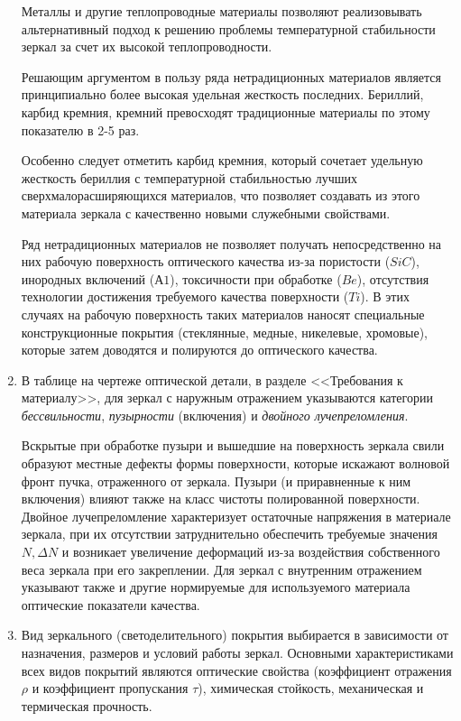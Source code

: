 \begin{enumerate}[leftmargin=*]
Металлы и другие теплопроводные материалы позволяют реализовывать альтернативный подход к решению проблемы температурной стабильности зеркал за счет их высокой теплопроводности.

Решающим аргументом в пользу ряда нетрадиционных материалов является принципиально более высокая удельная жесткость последних. Бериллий, карбид кремния, кремний превосходят традиционные материалы по этому показателю в 2-5 раз.

Особенно следует отметить карбид кремния, который сочетает удельную жесткость бериллия с температурной стабильностью лучших сверхмалорасширяющихся материалов, что позволяет создавать из этого материала зеркала с качественно новыми служебными свойствами.

Ряд нетрадиционных материалов не позволяет получать непосредственно на них рабочую поверхность оптического качества из-за пористости ($ SiC $), инородных включений ($ А1 $), токсичности при обработке ($ Be $), отсутствия технологии достижения требуемого качества поверхности ($ Ti $). В этих случаях на рабочую поверхность таких материалов наносят специальные конструкционные покрытия (стеклянные, медные, никелевые, хромовые), которые затем доводятся и полируются до оптического качества. 

\item В таблице на чертеже оптической детали, в разделе <<Требования к материалу>>, для зеркал с наружным отражением указываются категории \textit{бессвильности}, \textit{пузырности} (включения) и \textit{двойного лучепреломления}.

Вскрытые при обработке пузыри и вышедшие на поверхность зеркала свили образуют местные дефекты формы поверхности, которые искажают волновой фронт пучка, отраженного от зеркала. Пузыри (и приравненные к ним включения) влияют также на класс чистоты полированной поверхности. Двойное лучепреломление характеризует остаточные напряжения в материале зеркала, при их отсутствии затруднительно обеспечить требуемые значения $ N, \Delta N $ и возникает увеличение деформаций из-за воздействия собственного веса зеркала при его закреплении. Для зеркал с внутренним отражением указывают также и другие нормируемые для используемого материала оптические показатели качества.

\item Вид зеркального (светоделительного) покрытия выбирается в зависимости от назначения, размеров и условий работы зеркал.
Основными характеристиками всех видов покрытий являются оптические свойства (коэффициент отражения $ \rho $ и коэффициент пропускания $ \tau $), химическая стойкость, механическая и термическая прочность.


\end{enumerate}

